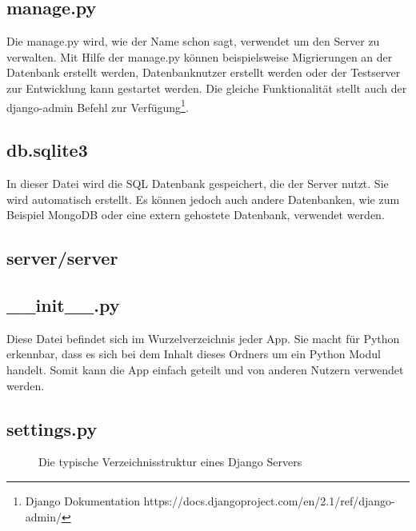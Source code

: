 \documentclass{article}
\begin{document}
\subsection{manage.py}
Die manage.py wird, wie der Name schon sagt, verwendet um den Server zu verwalten. Mit Hilfe der manage.py können beispielsweise Migrierungen an der Datenbank erstellt werden, Datenbanknutzer erstellt werden oder der Testserver zur Entwicklung kann gestartet werden. Die gleiche Funktionalität stellt auch der django-admin Befehl zur Verfügung\footnote{Django Dokumentation https://docs.djangoproject.com/en/2.1/ref/django-admin/}.

\subsection{db.sqlite3}
In dieser Datei wird die SQL Datenbank gespeichert, die der Server nutzt. Sie wird automatisch erstellt. Es können jedoch auch andere Datenbanken, wie zum Beispiel MongoDB oder eine extern gehostete Datenbank, verwendet werden.

\subsection{server/server} 
\subsection{\_\_init\_\_.py}
Diese Datei befindet sich im Wurzelverzeichnis jeder App. Sie macht für Python erkennbar, dass es sich bei dem Inhalt dieses Ordners um ein Python Modul handelt. Somit kann die App einfach geteilt und von anderen Nutzern verwendet werden.

\subsection{settings.py}


\begin{figure}[H]
	\caption{Die typische Verzeichnisstruktur eines Django Servers}
\end{figure}
\end{document}
